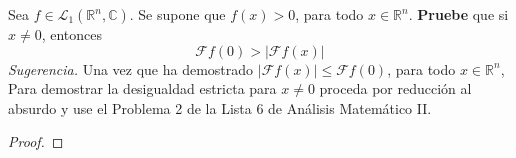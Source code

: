 \documentclass[12pt]{report}
\theoremstyle{largebreak}
\renewcommand{\leq}{\ensuremath{\leqslant}}
\newcommand\abs[1]{\ensuremath{\left|#1\right|}}
\newcommand{\fou}[1]{\ensuremath{\mathcal{F}#1}}
\begin{document}
    \begin{excer}
        Sea $f\in\mathcal{L}_1(\mathbb{R}^n,\mathbb{C})$. Se supone que $f(x)>0$, para todo $x\in\mathbb{R}^n$. \textbf{Pruebe} que si $x\neq0$, entonces
        \begin{equation*}
            \fou{f}(0)>\abs{\fou{f}(x)}
        \end{equation*}
        \textit{Sugerencia.} Una vez que ha demostrado $\abs{\fou{f}(x)}\leq\fou{f}(0)$, para todo $x\in\mathbb{R}^n$, Para demostrar la desigualdad estricta para $x\neq0$ proceda por reducción al absurdo y use el Problema 2 de la Lista 6 de Análisis Matemático II.
    \end{excer}

    \begin{proof}
        
    \end{proof}
    
\end{document}
